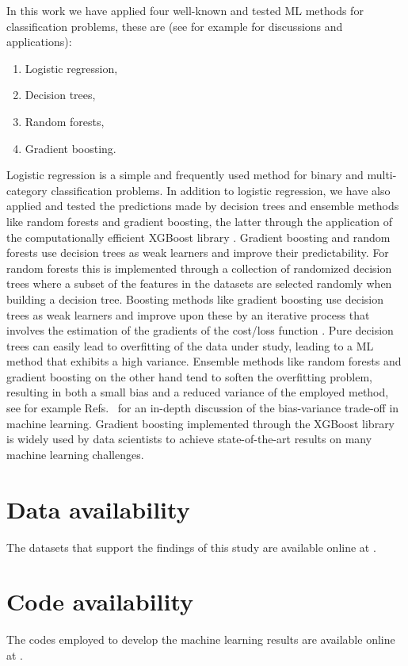 \documentclass[superscriptaddress,unsortedaddress,
 amsmath,amssymb,
 aps,
]{revtex4-2}
\begin{document}
In this work we have applied four well-known and tested ML methods for classification problems, these are (see for example \cite{Hastie2009,Mehta2019} for discussions and applications):
\begin{enumerate}
    \item Logistic regression,
    \item Decision trees,
    \item Random forests,
    \item Gradient boosting.
\end{enumerate}
Logistic regression \cite{Hastie2009} is a simple and frequently used method for binary and multi-category classification problems. In addition to logistic regression, we have also applied and tested the predictions made by decision trees and ensemble methods like random forests and gradient boosting, the latter through the application of the computationally efficient XGBoost library \cite{xgboost2016}. Gradient boosting and random forests use decision trees as weak learners and improve their predictability. For random forests this is implemented through a collection of randomized decision trees where a subset of the features in the datasets are selected randomly when building a decision tree. Boosting methods like gradient boosting use decision trees as weak learners and improve upon these by an iterative process that involves the estimation of the gradients of the cost/loss function  \cite{Hastie2009}. Pure decision trees can easily lead to overfitting of the data under study, leading to a ML method that exhibits a high variance. Ensemble methods like random forests and gradient boosting on the other hand tend to soften the overfitting problem, resulting in both a small bias and a reduced variance of the employed method, see for example Refs.~\cite{Hastie2009,Mehta2019} for an in-depth discussion of the bias-variance trade-off in machine learning. Gradient boosting implemented through the  XGBoost library \cite{xgboost2016} is widely used by data scientists to achieve state-of-the-art results on many machine learning challenges. 

\section*{Data availability} 
The datasets that support the findings of this study are available online at \cite{Ohebbi2021}.

\section*{Code availability} 
The codes employed to develop the machine learning results are available online at \cite{Ohebbi2021}. 
\end{document}
